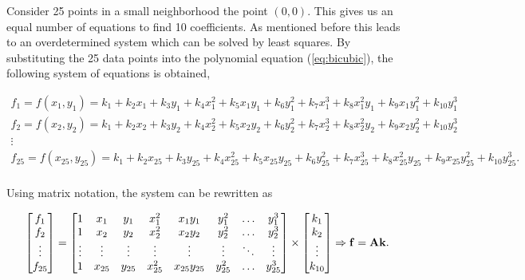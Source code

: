 \documentclass{ipol}
\numberwithin{equation}{section}
\numberwithin{table}{section}
\begin{document}
Consider 25 points in a small neighborhood the point $(0,0)$. This gives us an equal number of equations to find 10 coefficients. As mentioned before this leads to an overdetermined system which can be solved by least squares. 
By substituting the 25 data points into the polynomial equation (\ref{eq:bicubic}), the following system of 
equations is obtained,

\begin{equation*}
	\begin{array}{l}
		f_1 = f(x_1,y_1) = k_1 + k_2x_1 + k_3y_1 + k_4x_1^2 + k_5x_1y_1 + k_6y_1^2 + k_7x_1^3 + k_8x_1^2y_1 + k_9x_1y_1^2 + k_{10}y_1^3 \\
		f_2 = f(x_2,y_2) = k_1 + k_2x_2 + k_3y_2 + k_4x_2^2 + k_5x_2y_2 + k_6y_2^2 + k_7x_2^3 + k_8x_2^2y_2 + k_9x_2y_2^2 + k_{10}y_2^3 \\
		\vdots \\
		f_{25} = f(x_{25},y_{25}) = k_1 + k_2x_{25} + k_3y_{25} + k_4x_{25}^2 + k_5x_{25}y_{25} + k_6y_{25}^2 + k_7x_{25}^3 + k_8x_{25}^2y_{25} + k_9x_{25}y_{25}^2 + k_{10}y_{25}^3 . \\
	\end{array}
\end{equation*}

Using matrix notation, the system can be rewritten as

\begin{equation*}
	\begin{bmatrix} 
		f_1		\\ 
		f_2		\\ 
		\vdots	\\
		f_{25}
	\end{bmatrix} 
	= 
	\begin{bmatrix} 
		1 		& x_1 		& y_1 		& x_1^2 	& x_1y_1 		& y_1^2 	& \hdots 	& y_1^3 	\\
		1 		& x_2 		& y_2 		& x_2^2 	& x_2y_2 		& y_2^2 	& \hdots 	& y_2^3 	\\
		\vdots	& \vdots	& \vdots	& \vdots	& \vdots		& \vdots	& \ddots	& \vdots	\\
		1 		& x_{25}	& y_{25}	& x_{25}^2 	& x_{25}y_{25} 	& y_{25}^2 	& \hdots 	& y_{25}^3
	\end{bmatrix}
	\times
	\begin{bmatrix}
		k_1		\\
		k_2		\\
		\vdots	\\
		k_{10}
	\end{bmatrix}
	\Rightarrow \mathbf{f} = \mathbf{A}\mathbf{k} .\\
\end{equation*}
\end{document}
